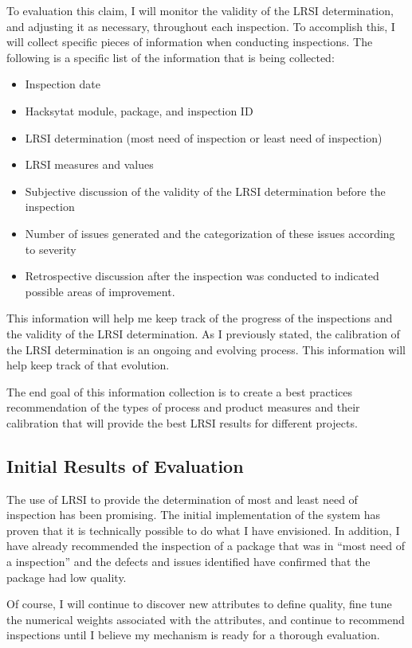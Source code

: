 \hspace*{1pt}

To evaluation this claim, I will monitor the validity of the LRSI
determination, and adjusting it as necessary, throughout each inspection.
To accomplish this, I will collect specific pieces of information when
conducting inspections. The following is a specific list of the information
that is being collected:

\begin{itemize}
\item Inspection date
\item Hacksytat module, package, and inspection ID
\item LRSI determination (most need of inspection or least need of
  inspection)
\item LRSI measures and values
\item Subjective discussion of the validity of the LRSI determination before 
  the inspection
\item Number of issues generated and the categorization of these issues
  according to severity
\item Retrospective discussion after the inspection was conducted to
  indicated possible areas of improvement. 
\end{itemize}

This information will help me keep track of the progress of the inspections 
and the validity of the LRSI determination. As I previously stated, the
calibration of the LRSI determination is an ongoing and evolving
process. This information will help keep track of that evolution. 

The end goal of this information collection is to create a best practices
recommendation of the types of process and product measures and their
calibration that will provide the best LRSI results for different projects.


\subsection{Initial Results of Evaluation}
\label{sec:intialresults}
The use of LRSI to provide the determination of most and least need of
inspection has been promising. The initial implementation of the system has
proven that it is technically possible to do what I have envisioned. In
addition, I have already recommended the inspection of a package that was
in ``most need of a inspection'' and the defects and issues identified have
confirmed that the package had low quality.

Of course, I will continue to discover new attributes to define quality,
fine tune the numerical weights associated with the attributes, and
continue to recommend inspections until I believe my mechanism is ready for a
thorough evaluation.















